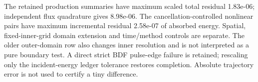 The retained production summaries have maximum scaled total residual 1.83e-06; independent flux quadrature gives 8.98e-06. The cancellation-controlled nonlinear pairs have maximum incremental residual 2.58e-07 of absorbed energy. Spatial, fixed-inner-grid domain extension and time/method controls are separate. The older outer-domain row also changes inner resolution and is not interpreted as a pure boundary test. A direct strict BDF pulse-edge failure is retained; rescaling only the incident-energy ledger tolerance restores completion. Absolute trajectory error is not used to certify a tiny difference.
